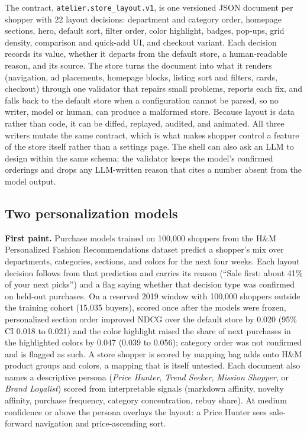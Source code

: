 \documentclass[sigconf, screen, review]{acmart}
\begin{document}
The contract, \texttt{atelier.store\_layout.v1}, is one versioned JSON document per shopper with 22 layout decisions: department and category order, homepage sections, hero, default sort, filter order, color highlight, badges, pop-ups, grid density, comparison and quick-add UI, and checkout variant. Each decision records its value, whether it departs from the default store, a human-readable reason, and its source. The store turns the document into what it renders (navigation, ad placements, homepage blocks, listing sort and filters, cards, checkout) through one validator that repairs small problems, reports each fix, and falls back to the default store when a configuration cannot be parsed, so no writer, model or human, can produce a malformed store. Because layout is data rather than code, it can be diffed, replayed, audited, and animated. All three writers mutate the same contract, which is what makes shopper control a feature of the store itself rather than a settings page. The shell can also ask an LLM to design within the same schema; the validator keeps the model's confirmed orderings and drops any LLM-written reason that cites a number absent from the model output.

\subsection{Two personalization models}

\textbf{First paint.} Purchase models trained on 100,000 shoppers from the H\&M Personalized Fashion Recommendations dataset \cite{hmdataset} predict a shopper's mix over departments, categories, sections, and colors for the next four weeks. Each layout decision follows from that prediction and carries its reason (``Sale first: about 41\% of your next picks'') and a flag saying whether that decision type was confirmed on held-out purchases. On a reserved 2019 window with 100,000 shoppers outside the training cohort (15,035 buyers), scored once after the models were frozen, personalized section order improved NDCG over the default store by 0.020 (95\% CI 0.018 to 0.021) and the color highlight raised the share of next purchases in the highlighted colors by 0.047 (0.039 to 0.056); category order was not confirmed and is flagged as such. A store shopper is scored by mapping bag adds onto H\&M product groups and colors, a mapping that is itself untested. Each document also names a descriptive persona (\emph{Price Hunter}, \emph{Trend Seeker}, \emph{Mission Shopper}, or \emph{Brand Loyalist}) scored from interpretable signals (markdown affinity, novelty affinity, purchase frequency, category concentration, rebuy share). At medium confidence or above the persona overlays the layout: a Price Hunter sees sale-forward navigation and price-ascending sort.
\end{document}
